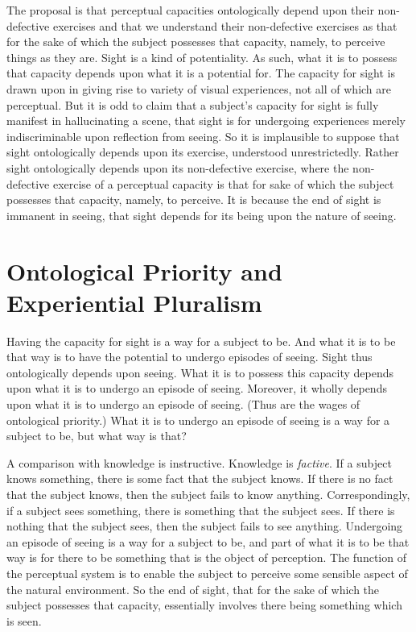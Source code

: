 \documentclass[12pt]{article}
\begin{document}
The proposal is that perceptual capacities ontologically depend upon their non-defective exercises and that we understand their non-defective exercises as that for the sake of which the subject possesses that capacity, namely, to perceive things as they are. Sight is a kind of potentiality. As such, what it is to possess that capacity depends upon what it is a potential for. The capacity for sight is drawn upon in giving rise to variety of visual experiences, not all of which are perceptual. But it is odd to claim that a subject's capacity for sight is fully manifest in hallucinating a scene, that sight is for undergoing experiences merely indiscriminable upon reflection from seeing. So it is implausible to suppose that sight ontologically depends upon its exercise, understood unrestrictedly. Rather sight ontologically depends upon its non-defective exercise, where the non-defective exercise of a perceptual capacity is that for sake of which the subject possesses that capacity, namely, to perceive. It is because the end of sight is immanent in seeing, that sight depends for its being upon the nature of seeing.


\section{Ontological Priority and Experiential Pluralism} %
\label{sec:ontological_priority_and_experiential_pluralism}

Having the capacity for sight is a way for a subject to be. And what it is to be that way is to have the potential to undergo episodes of seeing. Sight thus ontologically depends upon seeing. What it is to possess this capacity depends upon what it is to undergo an episode of seeing. Moreover, it wholly depends upon what it is to undergo an episode of seeing. (Thus are the wages of ontological priority.) What it is to undergo an episode of seeing is a way for a subject to be, but what way is that?

A comparison with knowledge is instructive. Knowledge is \emph{factive}. If a subject knows something, there is some fact that the subject knows. If there is no fact that the subject knows, then the subject fails to know anything. Correspondingly, if a subject sees something, there is something that the subject sees. If there is nothing that the subject sees, then the subject fails to see anything. Undergoing an episode of seeing is a way for a subject to be, and part of what it is to be that way is for there to be something that is the object of perception. The function of the perceptual system is to enable the subject to perceive some sensible aspect of the natural environment. So the end of sight, that for the sake of which the subject possesses that capacity, essentially involves there being something which is seen.
\end{document}
